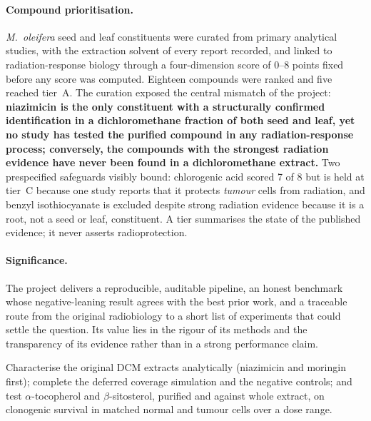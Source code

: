 \paragraph{Compound prioritisation.}
\textit{M.~oleifera} seed and leaf constituents were curated from primary analytical
studies, with the extraction solvent of every report recorded, and linked to
radiation-response biology through a four-dimension score of 0--8 points fixed before any
score was computed. Eighteen compounds were ranked and five reached tier~A. The curation
exposed the central mismatch of the project: \textbf{niazimicin is the only constituent
with a structurally confirmed identification in a dichloromethane fraction of both seed
and leaf, yet no study has tested the purified compound in any radiation-response process;
conversely, the compounds with the strongest radiation evidence have never been found in a
dichloromethane extract.} Two prespecified safeguards visibly bound: chlorogenic acid scored
7 of 8 but is held at tier~C because one study reports that it protects \emph{tumour} cells
from radiation, and benzyl isothiocyanate is excluded despite strong radiation evidence
because it is a root, not a seed or leaf, constituent. A tier summarises the state of the
published evidence; it never asserts radioprotection.

\paragraph{Significance.}
The project delivers a reproducible, auditable pipeline, an honest benchmark whose
negative-leaning result agrees with the best prior work, and a traceable route from the
original radiobiology to a short list of experiments that could settle the question. Its
value lies in the rigour of its methods and the transparency of its evidence rather than in
a strong performance claim.

\begin{keybox}[title={Recommended next steps.}]
Characterise the original DCM extracts analytically (niazimicin and moringin first);
complete the deferred coverage simulation and the negative controls; and test
$\alpha$-tocopherol and $\beta$-sitosterol, purified and against whole extract, on
clonogenic survival in matched normal and tumour cells over a dose range.
\end{keybox}
